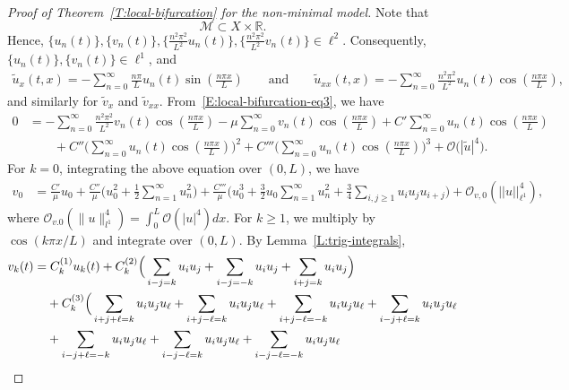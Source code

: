 \documentclass[11pt]{article} %
\newcommand{\norm}[1]{||#1||}
\theoremstyle{remark}
\theoremstyle{remark}
\numberwithin{equation}{section}
\numberwithin{figure}{section}
\numberwithin{table}{section}
\newcommand\RR{\ensuremath{\mathbb{R}}}
\begin{document}
\begin{proof}[Proof of Theorem~\ref{T:local-bifurcation}  for the non-minimal model]
  \smallskip


  Note that
  \[
    \mathcal{M}\subset X\times \RR.
  \]
  Hence, $\{u_n(t)\},\{v_n(t)\},\{\tfrac{n^2\pi^2}{L^2}u_n(t)\},
  \{\tfrac{n^2\pi^2}{L^2}v_n(t)\} \in \ell^2$. Consequently,
  $\{u_n(t)\},\{v_n(t)\} \in \ell^1$, and
  \begin{align*}
    \tilde{u}_x(t,x) =-\sum_{n=0}^\infty \tfrac{n \pi }{L}
    u_n(t)\sin(\tfrac{n\pi x}{L})\qquad\text{and}\qquad
    \tilde{u}_{xx}(t,x) =-\sum_{n=0}^\infty \tfrac{n^2 \pi^2 }{L^2}
    u_n(t)\cos(\tfrac{n\pi x}{L}),
  \end{align*}
  and similarly for $\tilde{v}_x$ and $\tilde{v}_{xx}$.
  From~\eqref{E:local-bifurcation-eq3}, we have
  \begin{align*}
    0 & = -\sum_{n=0}^\infty \frac{n^2\pi^2}{L^2}v_n(t)\cos(\tfrac{n\pi x}{L})
    - \mu\sum_{n=0}^\infty v_n(t)\cos(\tfrac{n\pi x}{L}) + C'\sum_{n=0}^\infty
    u_n(t)\cos(\tfrac{n\pi x}{L}) \\
    &
    \qquad
    +
    C''
    \Big(\sum_{n=0}^\infty
    u_n(t)\cos(\tfrac{n\pi
    x}{L})\Big)^2
    + C'''\Big(\sum_{n=0}^\infty u_n(t)\cos(\tfrac{n\pi x}{L})\Big)^3 +
    \mathcal{O}\big(|\tilde{u}|^4\big).
  \end{align*}
  For $k = 0$, integrating the above equation over $(0, L)$, we have
  \begin{align}\label{E:v0-eq}
    v_0
    &{ =\frac{C'}{\mu}u_0\! +\!\frac{C''}{\mu} \Big(u_0^2+\frac12\sum_{n=1}^\infty
    u_n^2\Big)
    +\frac{C'''}{\mu} \Big( u_0^3+\frac32u_0\sum_{n=1}^\infty\! u_n^2 +\frac34
    \sum_{i,j\ge1}u_i u_j u_{i+j} \Big)
    +\mathcal{O}_{v,0}\left(\norm{u}_{\ell^1}^4\right),}
  \end{align}
  { where $\mathcal{O}_{v.0}(\|u\|_{l^1}^4)=\int_0^L \mathcal{O}(|u|^4)dx$.}
  For $k \ge 1$, we multiply by $\cos\left(k\pi x/L\right)$ and integrate over
  $(0, L)$. By Lemma~\ref{L:trig-integrals},
  \begin{align}\label{E:vk-eq}
    v_k(t)
    = & \;C_k^{(1)}u_k(t)
    +C_k^{(2)}
    \Big(
    \sum_{ i-j =  k } u_i u_j
    + \sum_{ i-j = -k } u_i u_j
    + \sum_{ i+j =  k } u_i u_j
    \Big) \notag \\
    &
    +C_k^{(3)}
    \Big(
    \sum_{ i+j+\ell =  k } u_i u_j u_\ell
    + \sum_{ i+j-\ell =  k } u_i u_j u_\ell
    + \sum_{ i+j-\ell = -k } u_i u_j u_\ell
    + \sum_{ i-j+\ell =  k } u_i u_j u_\ell\notag \\
    &
    + \sum_{ i-j+\ell = -k } u_i u_j u_\ell
    + \sum_{ i-j-\ell =  k } u_i u_j u_\ell
    + \sum_{ i-j-\ell = -k } u_i u_j u_\ell

\end{align}
\end{proof}
\end{document}
